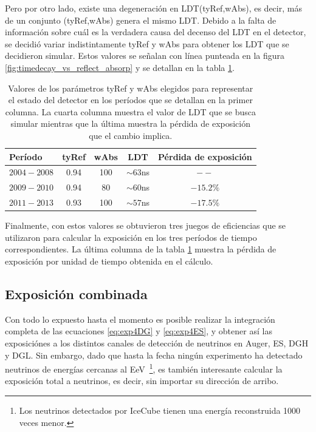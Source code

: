 	Pero por otro lado, existe una degeneración en LDT(tyRef,wAbs), es decir, más de un conjunto (tyRef,wAbs) genera el mismo LDT.
	Debido a la falta de información sobre cuál es la verdadera causa del decenso del LDT en el detector, se decidió variar indistintamente tyRef y wAbs para obtener los LDT que se decidieron simular.
	Estos valores se señalan con línea punteada en la figura \ref{fig:timedecay_vs_reflect_absorp} y se detallan en la tabla \ref{tab:ageingEffect}.
	\begin{table}[ht!]
	\centering
	\renewcommand{\arraystretch}{1.4}
	 \begin{tabular}{|l|ccc|c|}
				\hline
				Período       & tyRef & wAbs & LDT        &    Pérdida de exposición \\
				\hline
				$2004 - 2008$ & 0.94  & 100  & $\sim63$ns &    $--$ \\
				$2009 - 2010$ & 0.94  & 80   & $\sim60$ns &    $-15.2\%$\\
				$2011 - 2013$ & 0.93  & 100  & $\sim57$ns &    $-17.5\%$\\
				\hline
	 \end{tabular}
	 \caption{Valores de los parámetros tyRef y wAbs elegidos para representar el estado del detector en los períodos que se detallan en la primer columna. La cuarta columna muestra el valor de LDT que se busca simular mientras que la última muestra la pérdida de exposición que el cambio implica.}
	 \label{tab:ageingEffect}
	\end{table}
	Finalmente, con estos valores se obtuvieron tres juegos de eficiencias que se utilizaron para calcular la exposición en los tres períodos de tiempo correspondientes.
	La última columna de la tabla \ref{tab:ageingEffect} muestra la pérdida de exposición por unidad de tiempo obtenida en el cálculo.
	
	\subsection{Exposici\'on combinada}
	
	Con todo lo expuesto hasta el momento es posible realizar la integración completa de las ecuaciones \ref{eq:exp4DG} y \ref{eq:exp4ES}, y obtener así las exposiciónes a los distintos canales de detección de neutrinos en Auger, ES, DGH y DGL.
	Sin embargo, dado que hasta la fecha ningún experimento ha detectado neutrinos de energías cercanas al EeV~\footnote{Los neutrinos detectados por IceCube tienen una energía reconstruida 1000 veces menor.}, es también interesante calcular la exposición total a neutrinos, es decir, sin importar su dirección de arribo.
	
